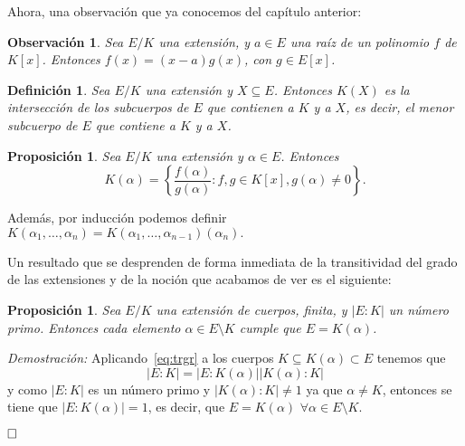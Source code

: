 \documentclass[12pt]{article}
\newtheorem{proposition}[theorem]{Proposición}
\newtheorem{definition}[theorem]{Definición}
\newtheorem{observation}{Observación}[theorem]
\begin{document}
Ahora, una observación que ya conocemos del capítulo anterior:
\begin{observation} Sea $E/K$ una extensión, y $a \in E$ una raíz de un polinomio $f$ de $K[x]$. Entonces $f(x) = (x-a)g(x)$, con $g \in E[x]$.
\end{observation} 

\begin{definition} Sea $E/K$ una extensión y $X \subseteq E$. Entonces $K(X)$ es la intersección de los subcuerpos de $E$ que contienen a $K$ y a $X$, es decir, el menor subcuerpo de $E$ que contiene a $K$ y a $X$.
\end{definition}

\begin{proposition} \label{eq:kalfa} Sea $E/K$ una extensión y $\alpha \in E$. Entonces $$K (\alpha) = \left\lbrace \dfrac{f(\alpha)}{g(\alpha)} : f,g \in K[x], g(\alpha) \neq 0 \right\rbrace.$$
\end{proposition}

Además, por inducción podemos definir $K(\alpha_{1}, \ldots, \alpha_{n} ) = K(\alpha_{1}, \ldots, \alpha_{n-1})(\alpha_{n}).$

Un resultado que se desprenden de forma inmediata de la transitividad del grado de las extensiones y de la noción que acabamos de ver es el siguiente:

\begin{proposition} Sea $E/K$ una extensión de cuerpos, finita, y $|E:K|$ un número primo. Entonces cada elemento $\alpha \in E \setminus K$ cumple que $E = K(\alpha)$.
\end{proposition}
\emph{Demostración: } Aplicando~\ref{eq:trgr} a los cuerpos $K \subseteq K(\alpha) \subset E$ tenemos que $$|E:K| = |E: K(\alpha)| |K(\alpha) : K|$$ y como $|E:K|$ es un número primo y $|K(\alpha) :K| \neq 1$ ya que $\alpha \neq K$, entonces se tiene que $|E:K(\alpha)| = 1$, es decir, que $E = K(\alpha)$ $\forall \alpha \in E \setminus K$.

$\hfill \square$
\end{document}
